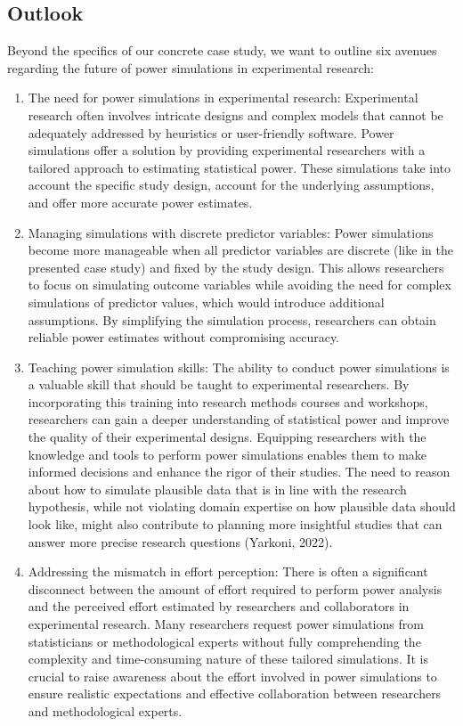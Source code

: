 \documentclass[
  man,floatsintext]{apa6}
\begin{document}
\hypertarget{outlook}{%
\subsection{Outlook}\label{outlook}}

Beyond the specifics of our concrete case study, we want to outline six avenues regarding the future of power simulations in experimental research:

\begin{enumerate}
\def\labelenumi{\arabic{enumi}.}
\item
  The need for power simulations in experimental research: Experimental research often involves intricate designs and complex models that cannot be adequately addressed by heuristics or user-friendly software. Power simulations offer a solution by providing experimental researchers with a tailored approach to estimating statistical power. These simulations take into account the specific study design, account for the underlying assumptions, and offer more accurate power estimates.
\item
  Managing simulations with discrete predictor variables: Power simulations become more manageable when all predictor variables are discrete (like in the presented case study) and fixed by the study design.
  This allows researchers to focus on simulating outcome variables while avoiding the need for complex simulations of predictor values, which would introduce additional assumptions. By simplifying the simulation process, researchers can obtain reliable power estimates without compromising accuracy.
\item
  Teaching power simulation skills: The ability to conduct power simulations is a valuable skill that should be taught to experimental researchers. By incorporating this training into research methods courses and workshops, researchers can gain a deeper understanding of statistical power and improve the quality of their experimental designs.
  Equipping researchers with the knowledge and tools to perform power simulations enables them to make informed decisions and enhance the rigor of their studies.
  The need to reason about how to simulate plausible data that is in line with the research hypothesis, while not violating domain expertise on how plausible data should look like, might also contribute to planning more insightful studies that can answer more precise research questions (Yarkoni, 2022).
\item
  Addressing the mismatch in effort perception: There is often a significant disconnect between the amount of effort required to perform power analysis and the perceived effort estimated by researchers and collaborators in experimental research. Many researchers request power simulations from statisticians or methodological experts without fully comprehending the complexity and time-consuming nature of these tailored simulations. It is crucial to raise awareness about the effort involved in power simulations to ensure realistic expectations and effective collaboration between researchers and methodological experts.

\end{enumerate}
\end{document}
